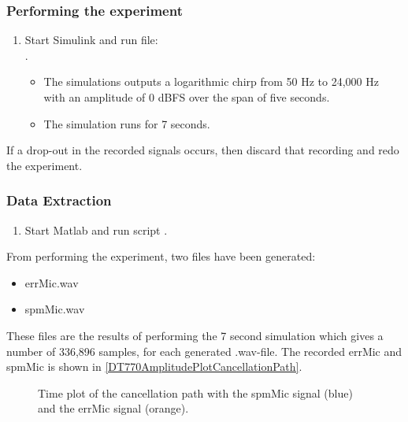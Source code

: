 \subsubsection{Performing the experiment}
\begin{enumerate}
	\item Start Simulink and run file: \\ .
	\begin{itemize} 
		\item The simulations outputs a logarithmic chirp from 50 Hz to 24,000 Hz with an amplitude of 0 dBFS over the span of five seconds.
		\item The simulation runs for 7 seconds. 
	\end{itemize}
	
	
\end{enumerate}

If a drop-out in the recorded signals occurs, then discard that recording and redo the experiment.


\subsubsection{Data Extraction}
\begin{enumerate}
	\item Start Matlab and run script .
\end{enumerate}
From performing the experiment, two files have been generated:
\begin{itemize}
	\item errMic.wav 
	\item spmMic.wav
\end{itemize}

These files are the results of performing the 7 second simulation which gives a number of 336,896 samples, for each generated .wav-file.
The recorded errMic and spmMic is shown in  \autoref{DT770AmplitudePlotCancellationPath}.

\begin{figure}[H]
	\centering
	
	\caption{Time plot of the cancellation path with the spmMic signal (blue) and the errMic signal (orange).}
	\label{DT770AmplitudePlotCancellationPath}
\end{figure}


